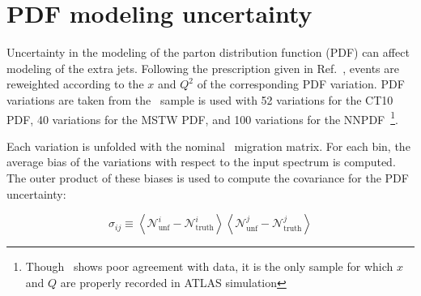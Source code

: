 \section{PDF modeling uncertainty}
\label{ss:pdf}
Uncertainty in the modeling of the parton distribution function (PDF) can affect modeling of the extra jets. Following the prescription given in Ref.~\cite{toppdf}, events are reweighted according to the $x$ and $Q^2$ of the corresponding PDF variation. PDF variations are taken from the \mcnlohw\ sample is used 
with 52 variations for the CT10 PDF, 40 variations for the MSTW PDF, and 100 variations for the NNPDF~\footnote{Though \mcnlohw\ shows poor agreement with data, it is the only sample for which $x$ and $Q$ are properly recorded in ATLAS simulation}. 

Each variation is unfolded with the nominal \mcnlohw\ migration matrix. For each bin, the average bias of the variations with respect to the input spectrum is computed. The outer product of these biases is used to compute the covariance for the PDF uncertainty:

\begin{displaymath}
\sigma_{ij} \equiv \left \langle {\mathscr N}^{i}_{\textrm{unf}}-{\mathscr N}^{i}_{\textrm{truth}} \right \rangle \left \langle {\mathscr N}^{j}_{\textrm{unf}}-{\mathscr N}^{j}_{\textrm{truth}} \right \rangle
\end{displaymath}

